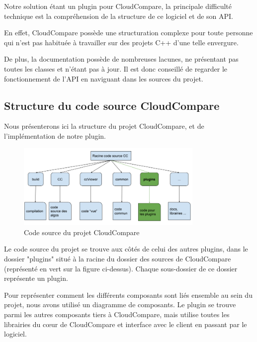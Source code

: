 \documentclass[12pt,titlepage,french]{article}
\begin{document}
Notre solution étant un plugin pour CloudCompare, la principale difficulté technique est la compréhension de la structure de ce logiciel et de son API. \newline

En effet, CloudCompare possède une structuration complexe pour toute personne qui n'est pas habituée à travailler sur des projets C++ d'une telle envergure.

De plus, la documentation possède de nombreuses lacunes, ne présentant pas toutes les classes et n'étant pas à jour.
Il est donc conseillé de regarder le fonctionnement de l'API en naviguant dans les sources du projet.

\subsection{Structure du code source CloudCompare}

Nous présenterons ici la structure du projet CloudCompare, et de l'implémentation de notre plugin.

\begin{figure}[H]
\center
  \includegraphics[width=0.8\textwidth]{./img/structure_code.PNG}
  \caption{\label{} Code source du projet CloudCompare}
\end{figure}

Le code source du projet se trouve aux côtés de celui des autres plugins, dans le dossier "plugins" situé à la racine du dossier des sources de CloudCompare (représenté en vert sur la figure ci-dessus). Chaque sous-dossier de ce dossier représente un plugin. \newline

Pour représenter comment les différents composants sont liés ensemble au sein du projet, nous avons utilisé un diagramme de composants. Le plugin se trouve parmi les autres composants tiers à CloudCompare, mais utilise toutes les librairies du cœur de CloudCompare et interface avec le client en passant par le logiciel.
\end{document}
